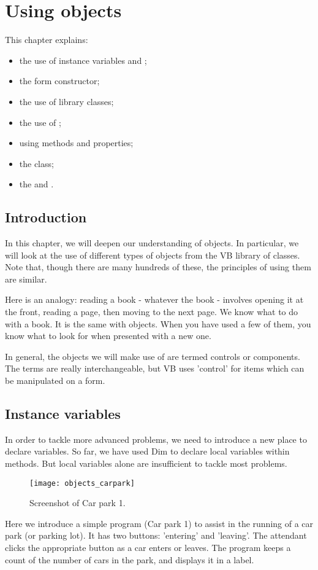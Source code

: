 \chapter{Using objects}
	\label{ch:objects}

	This chapter explains:
	\begin{itemize}
		\item the use of instance variables and ;
		\item the form constructor;
		\item the use of library classes;
		\item the use of ;
		\item using methods and properties;
		\item the  class;
		\item the  and .
	\end{itemize}


  \section{Introduction}
		In this chapter, we will deepen our understanding of objects. In particular, we will look at the use of different types of objects from the VB library of classes. Note that, though there are many hundreds of these, the principles of using them are similar.
		
		Here is an analogy: reading a book - whatever the book - involves opening it at the front, reading a page, then moving to the next page. We know what to do with a book. It is the same with objects. When you have used a few of them, you know what to look for when presented with a new one.
		
		In general, the objects we will make use of are termed controls or components. The terms are really interchangeable, but VB uses 'control' for items which can be manipulated on a form.

  \section{Instance variables}
		In order to tackle more advanced problems, we need to introduce a new place to declare variables. So far, we have used Dim to declare local variables within methods. But local variables alone are insufficient to tackle most problems.
	
		\begin{figure}[ht]
			\centering
			\texttt{[image: objects\_carpark]}
			\caption{Screenshot of Car park 1.}
			\label{fig:objects_carpark}
		\end{figure}
		Here we introduce a simple program (Car park 1) to assist in the running of a car park (or parking lot). It has two buttons: 'entering' and 'leaving'. The attendant clicks the appropriate button as a car enters or leaves. The program keeps a count of the number of cars in the park, and displays it in a label.
		
